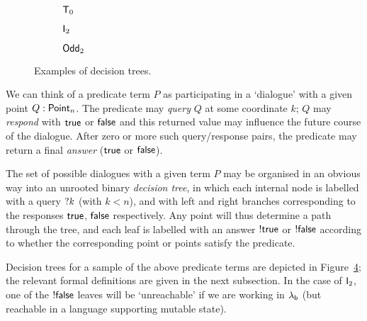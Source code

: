 \documentclass[12pt,phd,lfcs,twoside,openright,logo,leftchapter,normalheadings]{infthesis}
\theoremstyle{plain}
\theoremstyle{definition}
\begin{document}
\begin{figure}
  \centering
  \begin{subfigure}{0.1\textwidth}
    \begin{center}
    \vspace*{6.5ex}
    \scalebox{1.0}{\TTZeroModel}
    \vspace*{6.5ex}
    \end{center}
    \caption{$\mathsf{T}_0$}
    \label{fig:tt0-tree}
  \end{subfigure}
  \begin{subfigure}{0.3\textwidth}
    \begin{center}
    \scalebox{1.0}{\ShortConjModel}
    \end{center}
    \caption{$\mathsf{I}_2$}
    \label{fig:div1-tree}
  \end{subfigure}
  \begin{subfigure}{0.4\textwidth}
    \begin{center}
    \scalebox{1.0}{\XORTwoModel}
    \end{center}
    \caption{$\mathsf{Odd}_2$}
    \label{fig:xor2-tree}
  \end{subfigure}
  \caption{Examples of decision trees.}
  \label{fig:example-models}
\end{figure}

We can think of a predicate term $P$ as participating in a `dialogue'
with a given point $Q : \mathsf{Point}_n$.
The predicate may \emph{query} $Q$ at some coordinate $k$;
$Q$ may \emph{respond} with $\mathsf{true}$ or $\mathsf{false}$ and this returned value
may influence the future course of the dialogue.
After zero or more such query/response pairs, the predicate may return a
final \emph{answer} ($\mathsf{true}$ or $\mathsf{false}$).

The set of possible dialogues with a given term $P$ may be organised
in an obvious way into an unrooted binary \emph{decision tree}, in
which each internal node is labelled with a query $\mathord{?} k$ (with
$k<n$), and with left and right branches corresponding to the
responses $\mathsf{true}$, $\mathsf{false}$ respectively.  Any point will thus
determine a path through the tree, and each leaf is labelled with an
answer $\mathord{!} \mathsf{true}$ or $\mathord{!} \mathsf{false}$ according to whether the
corresponding point or points satisfy the predicate.

Decision trees for a sample of the above predicate terms are depicted
in Figure~\ref{fig:example-models}; the relevant formal definitions
are given in the next subsection.  In the case of $\mathsf{I}_2$, one of
the $\mathord{!} \mathsf{false}$ leaves will be `unreachable' if we are working in
$\lambda_{\mathsf{b}}$ (but reachable in a language supporting mutable state).
\end{document}
